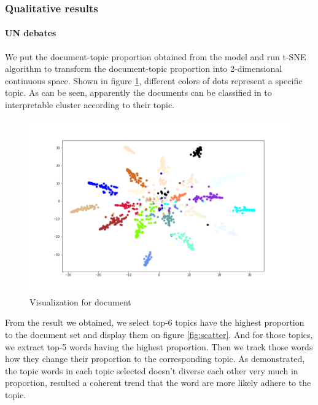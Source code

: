 \subsubsection{Qualitative results}
\paragraph{UN debates}We put the document-topic proportion obtained from the model and run t-SNE algorithm to transform the document-topic proportion into 2-dimensional continuous space. Shown in figure \ref{fig:tsne1}, different colors of dots represent a specific topic. As can be seen, apparently the documents can be classified in to interpretable cluster according to their topic.\\
\begin{figure}[h]
\centering
\includegraphics[width=0.9\linewidth]{figures/1128/tsne1}
\caption{Visualization for document}
\label{fig:tsne1}
\end{figure}
From the result we obtained, we select top-6 topics have the highest proportion to the document set and display them on figure \ref{fig:scatter}. And for those topics, we extract top-5 words having the highest proportion. Then we track those words how they change their proportion to the corresponding topic. As demonstrated, the topic words in each topic selected doesn't diverse each other very much in proportion, resulted a coherent trend that the word are more likely adhere to the topic.\\
